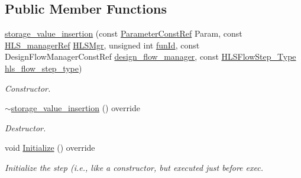 \subsection*{Public Member Functions}
\begin{DoxyCompactItemize}
\item 
\hyperlink{classstorage__value__insertion_a1410b828a19550cfa7821e33369dfcc8}{storage\+\_\+value\+\_\+insertion} (const \hyperlink{Parameter_8hpp_a37841774a6fcb479b597fdf8955eb4ea}{Parameter\+Const\+Ref} Param, const \hyperlink{hls__manager_8hpp_acd3842b8589fe52c08fc0b2fcc813bfe}{H\+L\+S\+\_\+manager\+Ref} \hyperlink{classHLS__step_ade85003a99d34134418451ddc46a18e9}{H\+L\+S\+Mgr}, unsigned int \hyperlink{classHLSFunctionStep_a3e6434fd86c698b0c70520b859bff5b0}{fun\+Id}, const Design\+Flow\+Manager\+Const\+Ref \hyperlink{classDesignFlowStep_ab770677ddf087613add30024e16a5554}{design\+\_\+flow\+\_\+manager}, const \hyperlink{hls__step_8hpp_ada16bc22905016180e26fc7e39537f8d}{H\+L\+S\+Flow\+Step\+\_\+\+Type} \hyperlink{classHLS__step_aefd59af15346ec3f10bf12bd756e6777}{hls\+\_\+flow\+\_\+step\+\_\+type})
\begin{DoxyCompactList}\small\item\em Constructor. \end{DoxyCompactList}\item 
\hyperlink{classstorage__value__insertion_a9695d583f283722d12d7c687b0529a8f}{$\sim$storage\+\_\+value\+\_\+insertion} () override
\begin{DoxyCompactList}\small\item\em Destructor. \end{DoxyCompactList}\item 
void \hyperlink{classstorage__value__insertion_a43f36ebf82f907a629125b1f0cc1b096}{Initialize} () override
\begin{DoxyCompactList}\small\item\em Initialize the step (i.\+e., like a constructor, but executed just before exec. \end{DoxyCompactList}\end{DoxyCompactItemize}

